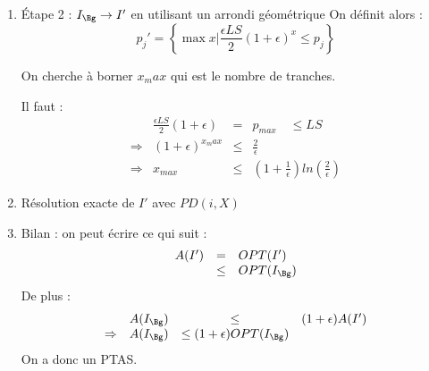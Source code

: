 \documentclass[a4paper, 11pt]{thesis}
\begin{document}
\begin{enumerate}
\begin{proof}
            Dans $I_{\Bg}$, si dans un ordonnancement,, il y a $x$ tâches sur une machine alors :
            \begin{displaymath}
                C_{max} > x \epsilon \frac{LS}{2}
            \end{displaymath}
            et avec $C_{max} > LS$, tout branchement est inutile., donc il faut :
            \begin{displaymath}
                x \epsilon \frac{LS}{2} \leq LS \Rightarrow x \leq \frac{2}{\epsilon}
            \end{displaymath}
            Une autre formulation est la suivante :
            Dans toute solution optimale de $I_{\Bg}$, il y a au plus $\displaystyle \left \lceil
            \frac{2}{\epsilon} \right \rceil $ tâches par machine.
        \end{proof}
    \item Étape 2 : $I_{\Bg} \rightarrow I'$ en utilisant un arrondi géométrique %
        On définit alors : \begin{displaymath}
            p_j' = \left \lbrace \max x | \frac{\epsilon LS}{2} (1 + \epsilon)^x \leq p_j \right \rbrace
        \end{displaymath}

        On cherche à borner $x_max$ qui est le nombre de tranches.

        Il faut : \begin{displaymath}
            \begin{array}{rrcl}
                &\displaystyle \frac{\epsilon LS}{2} (1 + \epsilon) & = & p_{max} \quad \leq LS \\
                \Rightarrow & (1 + \epsilon)^{x_max} & \leq & \displaystyle \frac{2}{\epsilon} \\
                \Rightarrow & x_{max} & \leq & \displaystyle \left (1 + \frac{1}{\epsilon} \right ) ln \left (\frac{2}{\epsilon}\right ) 
            \end{array}
        \end{displaymath}
    \item Résolution exacte de $I'$ avec $PD(i, X)$
    \item Bilan : on peut écrire ce qui suit :\begin{displaymath}
            \begin{array}{rcl}
                A(I') & = & OPT(I') \\
                      & \leq & OPT(I_{\Bg})
            \end{array}
        \end{displaymath}
        De plus : \begin{displaymath}
            \begin{array}{rrcl}
                & A(I_{\Bg}) & \leq & (1 + \epsilon) A(I') \\
                \Rightarrow & A(I_{\Bg}) & \leq (1 + \epsilon)OPT(I_{\Bg})
            \end{array}
        \end{displaymath}
        On a donc un PTAS.
\end{enumerate}
\end{document}
